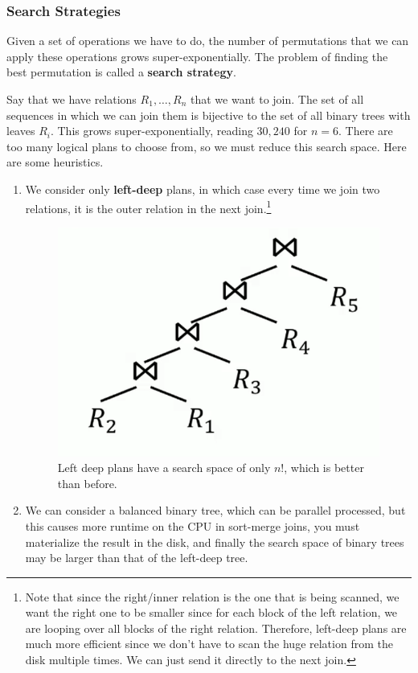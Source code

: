   \subsubsection{Search Strategies}  

    Given a set of operations we have to do, the number of permutations that we can apply these operations grows super-exponentially. The problem of finding the best permutation is called a \textbf{search strategy}. 

    \begin{example}
      Say that we have relations $R_1, \ldots, R_n$ that we want to join. The set of all sequences in which we can join them is bijective to the set of all binary trees with leaves $R_i$. This grows super-exponentially, reading $30,240$ for $n = 6$. There are too many logical plans to choose from, so we must reduce this search space. Here are some heuristics. 
      \begin{enumerate}
        \item We consider only \textbf{left-deep} plans, in which case every time we join two relations, it is the outer relation in the next join.\footnote{Note that since the right/inner relation is the one that is being scanned, we want the right one to be smaller since for each block of the left relation, we are looping over all blocks of the right relation. Therefore, left-deep plans are much more efficient since we don't have to scan the huge relation from the disk multiple times. We can just send it directly to the next join.} 

        \begin{figure}[H]
          \centering 
          \includegraphics[scale=0.6]{img/left_deep.png}
          \caption{Left deep plans have a search space of only $n!$, which is better than before. } 
          \label{fig:left_deep}
        \end{figure} 

        \item We can consider a balanced binary tree, which can be parallel processed, but this causes more runtime on the CPU in sort-merge joins, you must materialize the result in the disk, and finally the search space of binary trees may be larger than that of the left-deep tree. 
      \end{enumerate}
    \end{example}

